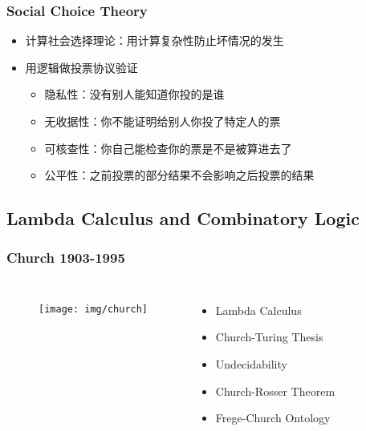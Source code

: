 \documentclass[UTF8,aspectratio=43,11pt,colorlinks,compress,openany]{beamer}%
\begin{document}
\begin{frame}\frametitle{Social Choice Theory}
\begin{itemize}
	\item 计算社会选择理论：用计算复杂性防止坏情况的发生
	\item 用逻辑做投票协议验证
		\begin{itemize}
			\item 隐私性：没有别人能知道你投的是谁
			\item 无收据性：你不能证明给别人你投了特定人的票
			\item 可核查性：你自己能检查你的票是不是被算进去了
			\item 公平性：之前投票的部分结果不会影响之后投票的结果
		\end{itemize}
\end{itemize}
\end{frame}

\subsection{Lambda Calculus and Combinatory Logic}

\begin{frame}\frametitle{Church 1903-1995}
\begin{columns}
\begin{figure}
	\texttt{[image: img/church]}
\end{figure}
\begin{itemize}
	\item Lambda Calculus
	\item Church-Turing Thesis
	\item Undecidability
	\item Church-Rosser Theorem
	\item Frege-Church Ontology
\end{itemize}
\end{columns}
\end{frame}
\end{document}
